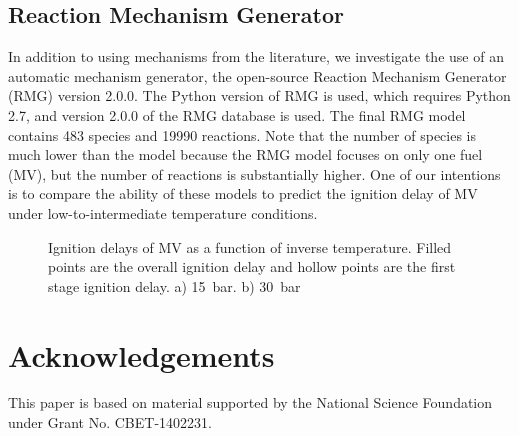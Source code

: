 \documentclass[12pt]{../ussci}
\begin{document}
\subsection{Reaction Mechanism Generator}\label{sec:reaction-mechanism-generator}

In addition to using mechanisms from the literature, we investigate the use of
an automatic mechanism generator, the open-source Reaction Mechanism Generator
(RMG) \autocite{Gao2016a} version 2.0.0. The Python version of RMG is used,
which requires Python 2.7, and version 2.0.0 of the RMG database is used. The
final RMG model contains 483 species and 19990 reactions. Note that the number
of species is much lower than the \textcite{Dievart2013} model because the RMG
model focuses on only one fuel (MV), but the number of reactions is
substantially higher. One of our intentions is to compare the ability of these
models to predict the ignition delay of MV under low-to-intermediate temperature
conditions.

\begin{figure}[htbp]
    \centering
    
    \caption{Ignition delays of MV as a function of inverse temperature. Filled points are the overall ignition delay and hollow points are the first stage ignition delay. a) \SI{15}{\bar}. b) \SI{30}{\bar}}
    \label{fig:ignition-delays}
\end{figure}

\section{Acknowledgements}\label{sec:acknowledgements}

This paper is based on material supported by the National Science
Foundation under Grant No. CBET-1402231.

\printbibliography
\end{document}

